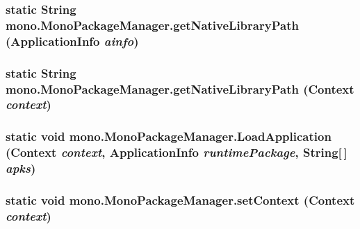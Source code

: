\hypertarget{classmono_1_1_mono_package_manager_31c4187d99088755db423f5714aaf460}{
\subsubsection[{getNativeLibraryPath}]{\setlength{\rightskip}{0pt plus 5cm}static String mono.MonoPackageManager.getNativeLibraryPath (ApplicationInfo {\em ainfo})}}
\label{classmono_1_1_mono_package_manager_31c4187d99088755db423f5714aaf460}


\hypertarget{classmono_1_1_mono_package_manager_4f1f811bd8f3954ebe3425b3aeec2522}{
\subsubsection[{getNativeLibraryPath}]{\setlength{\rightskip}{0pt plus 5cm}static String mono.MonoPackageManager.getNativeLibraryPath ({\bf Context} {\em context})}}
\label{classmono_1_1_mono_package_manager_4f1f811bd8f3954ebe3425b3aeec2522}


\hypertarget{classmono_1_1_mono_package_manager_5a2d5fc7f4891ab84e6deeae523686a2}{
\subsubsection[{LoadApplication}]{\setlength{\rightskip}{0pt plus 5cm}static void mono.MonoPackageManager.LoadApplication ({\bf Context} {\em context}, \/  ApplicationInfo {\em runtimePackage}, \/  String\mbox{[}$\,$\mbox{]} {\em apks})}}
\label{classmono_1_1_mono_package_manager_5a2d5fc7f4891ab84e6deeae523686a2}


\hypertarget{classmono_1_1_mono_package_manager_d3ff1f574349729b27f86da6c25c0f55}{
\subsubsection[{setContext}]{\setlength{\rightskip}{0pt plus 5cm}static void mono.MonoPackageManager.setContext ({\bf Context} {\em context})}}
\label{classmono_1_1_mono_package_manager_d3ff1f574349729b27f86da6c25c0f55}




